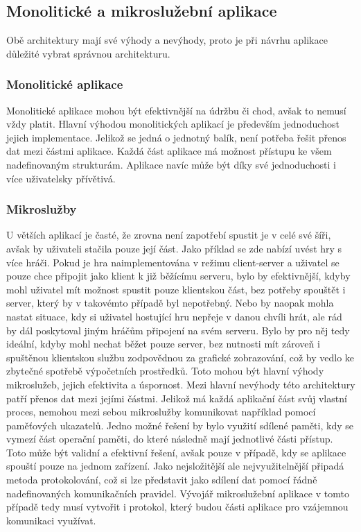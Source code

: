 \documentclass[FM,BP]{tulthesis}
\begin{document}
\subsection{Monolitické a mikroslužební aplikace}
Obě architektury mají své výhody a nevýhody, proto je při návrhu aplikace důležité vybrat správnou architekturu.
\subsubsection{Monolitické aplikace}
Monolitické aplikace mohou být efektivnější na údržbu či chod, avšak to nemusí vždy platit\cite{atlassian_mono_vs_micro}. Hlavní výhodou monolitických aplikací je především jednoduchost jejich implementace. Jelikož se jedná o jednotný balík, není potřeba řešit přenos dat mezi částmi aplikace. Každá část aplikace má možnost přístupu ke všem nadefinovaným strukturám. Aplikace navíc může být díky své jednoduchosti i více uživatelsky přívětivá.
\subsubsection{Mikroslužby}
U větších aplikací je časté, že zrovna není zapotřebí spustit je v celé své šíři, avšak by uživateli stačila pouze její část. Jako příklad se zde nabízí uvést hry s více hráči. Pokud je hra naimplementována v režimu client-server a uživatel se pouze chce připojit jako klient k již běžícímu serveru, bylo by efektivnější, kdyby mohl uživatel mít možnost spustit pouze klientskou část, bez potřeby spouštět i server, který by v takovémto případě byl nepotřebný. Nebo by naopak mohla nastat situace, kdy si uživatel hostující hru nepřeje v danou chvíli hrát, ale rád by dál poskytoval jiným hráčům připojení na svém serveru. Bylo by pro něj tedy ideální, kdyby mohl nechat běžet pouze server, bez nutnosti mít zároveň i spuštěnou klientskou službu zodpovědnou za grafické zobrazování, což by vedlo ke zbytečné spotřebě výpočetních prostředků. Toto mohou být hlavní výhody mikroslužeb, jejich efektivita a úspornost.
Mezi hlavní nevýhody této architektury patří přenos dat mezi jejími částmi. Jelikož má každá aplikační část svůj vlastní proces, nemohou mezi sebou mikroslužby komunikovat například pomocí paměťových ukazatelů. Jedno možné řešení by bylo využití sdílené paměti, kdy se vymezí část operační paměti, do které následně mají jednotlivé části přístup. Toto může být validní a efektivní řešení, avšak pouze v případě, kdy se aplikace spouští pouze na jednom zařízení.
Jako nejsložitější ale nejvyužitelnější připadá metoda protokolování, což si lze představit jako sdílení dat pomocí řádně nadefinovaných komunikačních pravidel.
Vývojář mikroslužební aplikace v tomto případě tedy musí vytvořit i protokol, který budou části aplikace pro vzájemnou komunikaci využívat.
\end{document}
